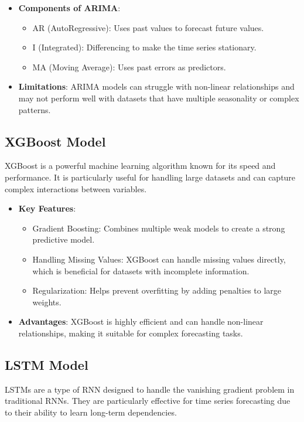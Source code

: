 \documentclass{article}
\begin{document}
\begin{itemize}
    \item \textbf{Components of ARIMA}:
    \begin{itemize}
        \item AR (AutoRegressive): Uses past values to forecast future values.
        \item I (Integrated): Differencing to make the time series stationary.
        \item MA (Moving Average): Uses past errors as predictors.
    \end{itemize}
    \item \textbf{Limitations}: ARIMA models can struggle with non-linear relationships and may not perform well with datasets that have multiple seasonality or complex patterns.
\end{itemize}

\subsection{XGBoost Model}
XGBoost is a powerful machine learning algorithm known for its speed and performance. It is particularly useful for handling large datasets and can capture complex interactions between variables.

\begin{itemize}
    \item \textbf{Key Features}:
    \begin{itemize}
        \item Gradient Boosting: Combines multiple weak models to create a strong predictive model.
        \item Handling Missing Values: XGBoost can handle missing values directly, which is beneficial for datasets with incomplete information.
        \item Regularization: Helps prevent overfitting by adding penalties to large weights.
    \end{itemize}
    \item \textbf{Advantages}: XGBoost is highly efficient and can handle non-linear relationships, making it suitable for complex forecasting tasks.
\end{itemize}

\subsection{LSTM Model}
LSTMs are a type of RNN designed to handle the vanishing gradient problem in traditional RNNs. They are particularly effective for time series forecasting due to their ability to learn long-term dependencies.
\end{document}
